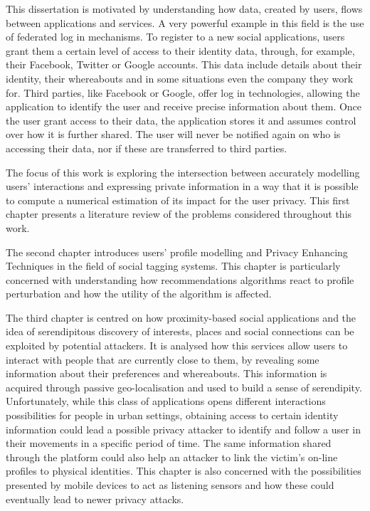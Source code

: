 This dissertation is motivated by understanding how data, created by users, flows between applications and services. A very powerful example in this field is the use of federated log in mechanisms. To register to a new social applications, users grant them a certain level of access to their identity data, through, for example, their Facebook, Twitter or Google accounts. This data include details about their identity, their whereabouts and in some situations even the company they work for. Third parties, like Facebook or Google, offer log in technologies, allowing the application to identify the user and receive precise information about them. Once the user grant access to their data, the application stores it and assumes control over how it is further shared. The user will never be notified again on who is accessing their data, nor if these are transferred to third parties. 

The focus of this work is exploring the intersection between accurately modelling users' interactions and expressing private information in a way that it is possible to compute a numerical estimation of its impact for the user privacy. This first chapter presents a literature review of the problems considered throughout this work.

The second chapter introduces users' profile modelling and Privacy Enhancing Techniques in the field of social tagging systems. This chapter is particularly concerned with understanding how recommendations algorithms react to profile perturbation and how the utility of the algorithm is affected.

The third chapter is centred on how proximity-based social applications and the idea of serendipitous discovery of interests, places and social connections can be exploited by potential attackers. It is analysed how this services allow users to interact with people that are currently close to them, by revealing some information about their preferences and whereabouts. This information is acquired through passive geo-localisation and used to build a sense of serendipity. Unfortunately, while this class of applications opens different interactions possibilities for people in urban settings, obtaining access to certain identity information could lead a possible privacy attacker to identify and follow a user in their movements in a specific period of time. The same information shared through the platform could also help an attacker to link the victim’s on-line profiles to physical identities. This chapter is also concerned with the possibilities presented by mobile devices to act as listening sensors and how these could eventually lead to newer privacy attacks.

